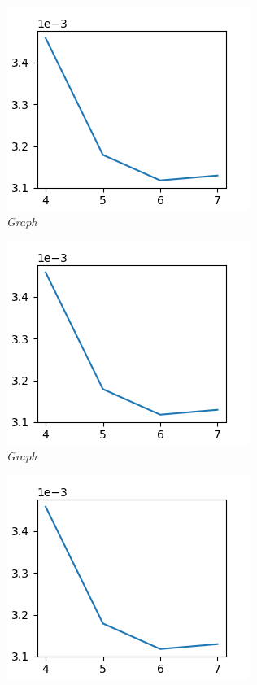 \documentclass{article}
\begin{document}
        \begin{figure}[!ht]
            \begin{subfigure}{.33\linewidth}
                \centering
                \includegraphics[width=.8\linewidth]{pics/hpp-d.png}
                \caption{\textit{Graph}}
            \end{subfigure}
            \begin{subfigure}{.33\linewidth}
                \centering
                \includegraphics[width=.8\linewidth]{pics/hpp-d.png}
                \caption{\textit{Graph}}
            \end{subfigure}
            \begin{subfigure}{.33\linewidth}
                \centering
                \includegraphics[width=.8\linewidth]{pics/hpp-d.png}

\end{subfigure}
\end{figure}
\end{document}

